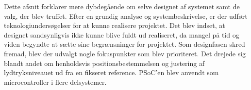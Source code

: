 
Dette afsnit forklarer mere dybdegående om selve designet af systemet samt de valg, der blev truffet.
Efter en grundig analyse og systembeskrivelse, er der udført teknologiundersøgelser for at kunne realisere projektet. Det blev indset, at designet sandsynligvis ikke kunne blive fuldt ud realiseret, da mangel på tid og viden begyndte at sætte sine begrænsninger for projektet. Som designfasen skred fremad, blev der udvalgt nogle fokuspunkter som blev prioriteret. Det drejede sig blandt andet om henholdsvis positionsbestemmelsen og justering af lydtryksniveauet ud fra en fikseret reference. PSoC'en blev anvendt som microcontroller i flere delsystemer.

